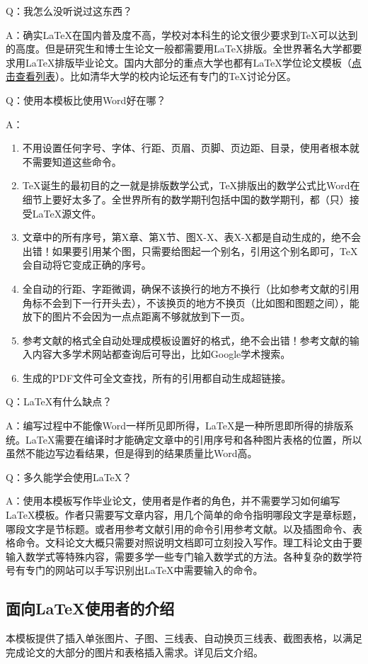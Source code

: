 Q：我怎么没听说过这东西？

A：确实\LaTeX{}在国内普及度不高，学校对本科生的论文很少要求到\TeX{}可以达到的高度。但是研究生和博士生论文一般都需要用\LaTeX{}排版。全世界著名大学都要求用\LaTeX{}排版毕业论文。国内大部分的重点大学也都有\LaTeX{}学位论文模板（\href{http://zzg34b.w3.c361.com/templet/graduateThesis.htm}{点击查看列表}）。比如清华大学的校内论坛还有专门的TeX讨论分区。

Q：使用本模板比使用Word好在哪？

A：
\begin{enumerate}
\item 不用设置任何字号、字体、行距、页眉、页脚、页边距、目录，使用者根本就不需要知道这些命令。
\item \TeX{}诞生的最初目的之一就是排版数学公式，\TeX{}排版出的数学公式比Word在细节上要好太多了。全世界所有的数学期刊包括中国的数学期刊，都（只）接受\LaTeX{}源文件。
\item 文章中的所有序号，第X章、第X节、图X-X、表X-X都是自动生成的，绝不会出错！如果要引用某个图，只需要给图起一个别名，引用这个别名即可，TeX会自动将它变成正确的序号。
\item 全自动的行距、字距微调，确保不该换行的地方不换行（比如参考文献的引用角标不会到下一行开头去），不该换页的地方不换页（比如图和图题之间），能放下的图片不会因为一点点距离不够就放到下一页。
\item 参考文献的格式全自动处理成模板设置好的格式，绝不会出错！参考文献的输入内容大多学术网站都查询后可导出，比如Google学术搜索。
\item 生成的PDF文件可全文查找，所有的引用都自动生成超链接。
\end{enumerate}

Q：\LaTeX{}有什么缺点？

A：编写过程中不能像Word一样所见即所得，\LaTeX{}是一种所思即所得的排版系统。\LaTeX{}需要在编译时才能确定文章中的引用序号和各种图片表格的位置，所以虽然不能边写边看结果，但是得到的结果质量比Word高。

Q：多久能学会使用\LaTeX{}？

A：使用本模板写作毕业论文，使用者是作者的角色，并不需要学习如何编写\LaTeX{}模板。作者只需要写文章内容，用几个简单的命令指明哪段文字是章标题，哪段文字是节标题。或者用参考文献引用的命令引用参考文献。以及插图命令、表格命令。文科论文大概只需要对照说明文档即可立刻投入写作。理工科论文由于要输入数学式等特殊内容，需要多学一些专门输入数学式的方法。各种复杂的数学符号有专门的网站可以手写识别出LaTeX中需要输入的命令。

\subsection{面向\LaTeX{}使用者的介绍}
本模板提供了插入单张图片、子图、三线表、自动换页三线表、截图表格，以满足完成论文的大部分的图片和表格插入需求。详见后文介绍。

